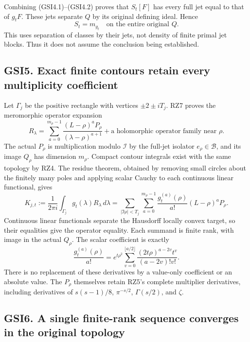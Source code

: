 Combining (GSI4.1)--(GSI4.2) proves that \(S_t[F]\) has every full jet
equal to that of \(g_tF\). These jets separate \(Q\) by its original
defining ideal. Hence \[
\boxed{S_t=m_{g_t}\quad\text{on the entire original }Q.}
\tag{GSI4.3}
\] This uses separation of classes by their jets, not density of finite
primal jet blocks. Thus it does not assume the conclusion being
established.

\subsection{GSI5. Exact finite contours retain every multiplicity
coefficient}\label{gsi5.-exact-finite-contours-retain-every-multiplicity-coefficient}

Let \(\Gamma_j\) be the positive rectangle with vertices
\(\pm2\pm iT_j\). RZ7 proves the meromorphic operator expansion \[
R_\lambda=\sum_{a=0}^{m_\rho-1}
\frac{(L-\rho)^aP_\rho}{(\lambda-\rho)^{a+1}}
+\text{a holomorphic operator family near }\rho.
\tag{GSI5.1}
\] The actual \(P_\rho\) is multiplication modulo \(\mathcal I\) by the
full-jet isolator \(e_\rho\in\mathcal B\), and its image \(Q_\rho\) has
dimension \(m_\rho\). Compact contour integrals exist with the same
topology by RZ4. The residue theorem, obtained by removing small circles
about the finitely many poles and applying scalar Cauchy to each
continuous linear functional, gives \[
K_{j,t}:=\frac1{2\pi i}\int_{\Gamma_j}g_t(\lambda)R_\lambda\,d\lambda
=\sum_{|\Im\rho|<T_j}\sum_{a=0}^{m_\rho-1}
\frac{g_t^{(a)}(\rho)}{a!}(L-\rho)^aP_\rho.
\tag{GSI5.2}
\] Continuous linear functionals separate the Hausdorff locally convex
target, so their equalities give the operator equality. Each summand is
finite rank, with image in the actual \(Q_\rho\). The scalar coefficient
is exactly \[
\frac{g_t^{(a)}(\rho)}{a!}
=e^{t\rho^2}\sum_{v=0}^{\lfloor a/2\rfloor}
\frac{(2t\rho)^{a-2v}t^v}{(a-2v)!v!}.
\tag{GSI5.3}
\] There is no replacement of these derivatives by a value-only
coefficient or an absolute value. The \(P_\rho\) themselves retain RZ5's
complete multiplier derivatives, including derivatives of \(s(s-1)/8\),
\(\pi^{-s/2}\), \(\Gamma(s/2)\), and \(\zeta\).

\subsection{GSI6. A single finite-rank sequence converges in the
original
topology}\label{gsi6.-a-single-finite-rank-sequence-converges-in-the-original-topology}

